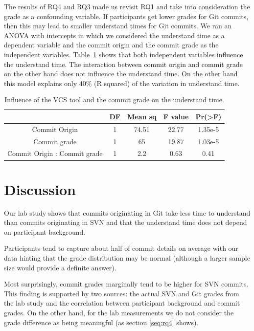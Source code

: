 \documentclass[letterpaper]{article}
\begin{document}
The results of RQ4 and RQ3 made us revisit RQ1 and take into consideration the grade as a confounding variable.
If participants get lower grades for Git commits, then this may lead to smaller understand times for Git commits.
We ran an ANOVA with intercepts in which we considered the understand time as a dependent variable and the commit origin and the commit grade as the independent variables.
Table~\ref{tab:rq4_anovas} shows that both independent variables influence the understand time.
The interaction between commit origin and commit grade on the other hand does not influence the understand time.
On the other hand this model explains only 40\% (R squared) of the variation in understand time.

\begin{table}[H]
	\centering
	\begin{tabular}{c | c c c c}
													& DF	&	Mean sq	&	F value	&	Pr(\textgreater F)	\\ \hline
	Commit Origin							& 1	&	74.51		&	22.77	&	1.35e-5					\\ 
	Commit grade							& 1	&	65			&	19.87	&	1.03e-5					\\
	Commit Origin : Commit grade	& 1	&	2.2			&	0.63	&	0.41						\\
	\end{tabular}
	\caption{Influence of the VCS tool and the commit grade on the understand time.}
	\label{tab:rq4_anovas}
\end{table}

\section{Discussion}

Our lab study shows that commits originating in Git take less time to understand than commits originating in SVN and that the understand time does not depend on participant background.

Participants tend to capture about half of commit details on average with our data hinting that the grade distribution may be normal (although a larger sample size would provide a definite answer).

Most surprisingly, commit grades marginally tend to be higher for SVN commits.
This finding is supported by two sources: the actual SVN and Git grades from the lab study and the correlation between participant background and commit grades.
On the other hand, for the lab measurements we do not consider the grade difference as being meaningful (as section \ref{seq:rq4} shows).
\end{document}
